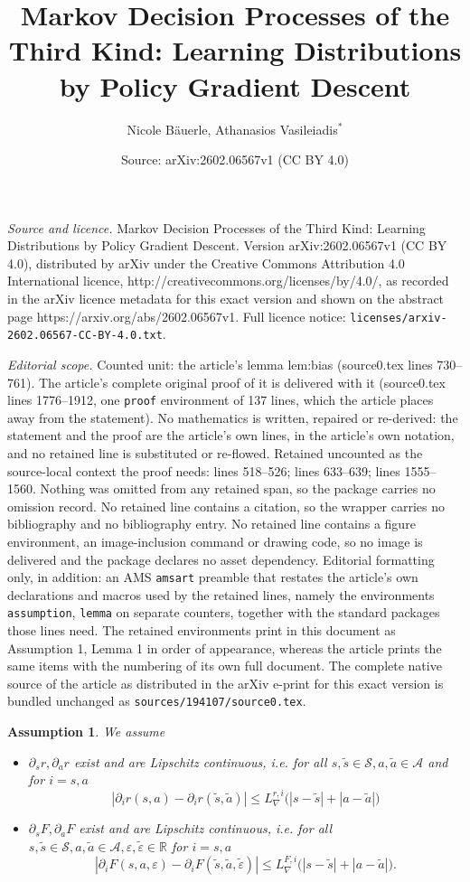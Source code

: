 \documentclass[10pt,a4paper]{amsart}
\title{Markov Decision Processes of the Third Kind: Learning Distributions by Policy Gradient Descent}
\author{Nicole B\"auerle, Athanasios Vasileiadis$^*$}
\date{Source: arXiv:2602.06567v1 (CC BY 4.0)}
\newtheorem{assumption}{Assumption}
\newcommand\RR{\mathbb R}
\newcommand\cA{\mathcal A}
\newcommand\cS{\mathcal S}
\begin{document}
\maketitle

\noindent\emph{Source and licence.} Markov Decision Processes of the Third Kind: Learning Distributions by Policy Gradient Descent. Version arXiv:2602.06567v1 (CC BY 4.0), distributed by arXiv under the Creative Commons Attribution 4.0 International licence, http://creativecommons.org/licenses/by/4.0/, as recorded in the arXiv licence metadata for this exact version and shown on the abstract page https://arxiv.org/abs/2602.06567v1. Full licence notice: \texttt{licenses/arxiv-2602.06567-CC-BY-4.0.txt}.\par\smallskip

\noindent\textit{Editorial scope.} Counted unit: the article's lemma lem:bias (source0.tex lines 730--761). The article's complete original proof of it is delivered with it (source0.tex lines 1776--1912, one \texttt{proof} environment of 137 lines, which the article places away from the statement). No mathematics is written, repaired or re-derived: the statement and the proof are the article's own lines, in the article's own notation, and no retained line is substituted or re-flowed.  Retained uncounted as the source-local context the proof needs: lines 518--526; lines 633--639; lines 1555--1560.  Nothing was omitted from any retained span, so the package carries no omission record.  No retained line contains a citation, so the wrapper carries no bibliography and no bibliography entry.  No retained line contains a figure environment, an image-inclusion command or drawing code, so no image is delivered and the package declares no asset dependency.  Editorial formatting only, in addition: an AMS \texttt{amsart} preamble that restates the article's own declarations and macros used by the retained lines, namely the environments \texttt{assumption}, \texttt{lemma} on separate counters, together with the standard packages those lines need.  The retained environments print in this document as Assumption 1, Lemma 1 in order of appearance, whereas the article prints the same items with the numbering of its own full document.  The complete native source of the article as distributed in the arXiv e-print for this exact version is bundled unchanged as \texttt{sources/194107/source0.tex}.
\begin{assumption} \label{ass:rFLipgrad}
We assume
\begin{itemize}
\item[(i)]$\partial_s r, \partial_a r$ exist and are  Lipschitz continuous, i.e. for all $s,\tilde s\in \cS,a, \tilde a \in \cA $ and for $i=s,a$
$$|\partial_i r(s,a)-\partial_ir(\tilde s,\tilde a)| \le L_{\nabla}^{r,i} \big( |s-\tilde s| + |a-\tilde a|  \big)$$
\item[(ii)] $\partial_s  F, \partial_a F$ exist and are Lipschitz continuous, i.e. for all $s,\tilde s\in \cS,a, \tilde a \in \cA,\varepsilon,\tilde\varepsilon\in\RR $ for $ i=s,a$
$$|\partial_iF(s,a,\varepsilon)-\partial_i F(\tilde s,\tilde a,\tilde\varepsilon)| \le L_{\nabla}^{F,i} \big( |s-\tilde s| + |a-\tilde a|\big). $$
\end{itemize}
\end{assumption}
\end{document}
